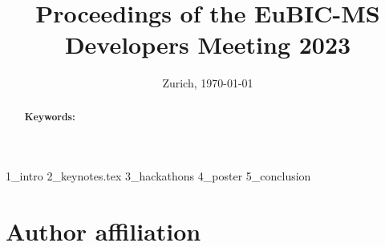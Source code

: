 \documentclass[11pt,a4paper,DIV21,abstracton]{scrartcl}
\title{Proceedings of the EuBIC-MS Developers Meeting 2023}
\author{
	
}
\date{{\small Zurich, \today}}
\begin{document}
\maketitle
\begin{abstract}
	
	\vspace{0.5cm}
	\textbf{Keywords:
	}
	
\end{abstract}


 {1_intro}
 {2_keynotes.tex}
 {3_hackathons}
 {4_poster}
 {5_conclusion}




\appendix
\section{Author affiliation}

\begin{table}[h]
\centering
\label{tab:affiliation}

\caption{Author affiliation; grouped by author and ordered by affiliation.}
\end{table}
\end{document}
